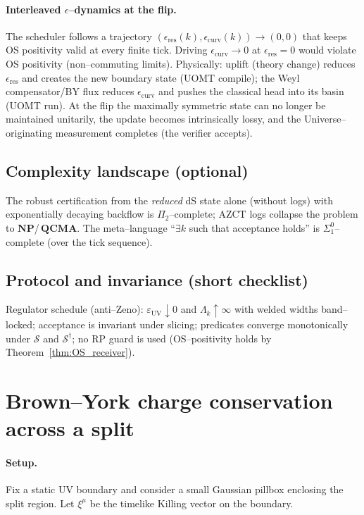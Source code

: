 \documentclass[10pt]{article}
\theoremstyle{definition}
\theoremstyle{plain}
\begin{document}
\paragraph{Interleaved $\epsilon$--dynamics at the flip.}\label{par:uom-main-205}
The scheduler follows a trajectory $(\epsilon_{\mathrm{res}}(k),\epsilon_{\mathrm{curv}}(k))\to(0,0)$ that keeps OS positivity valid at every finite tick.
Driving $\epsilon_{\mathrm{curv}}\to 0$ at $\epsilon_{\mathrm{res}}=0$ would violate OS positivity (non--commuting limits).
Physically: uplift (theory change) reduces $\epsilon_{\mathrm{res}}$ and creates the new boundary state (UOMT compile); the Weyl compensator/BY flux reduces $\epsilon_{\mathrm{curv}}$ and pushes the classical head into its basin (UOMT run).
At the flip the maximally symmetric state can no longer be maintained unitarily, the update becomes intrinsically lossy, and the Universe--originating measurement completes (the verifier accepts).

\subsection{Complexity landscape (optional)}
\label{subsec:complexity-8}
The robust certification from the \emph{reduced} dS state alone (without logs) with exponentially decaying backflow is $\Pi_2$--complete; AZCT logs collapse the problem to $\mathbf{NP}$/\,$\mathbf{QCMA}$.
The meta--language ``$\exists k$ such that acceptance holds'' is $\Sigma^0_1$--complete (over the tick sequence).

\subsection{Protocol and invariance (short checklist)}
\label{subsec:protocol-8}
Regulator schedule (anti--Zeno): $\varepsilon_{\mathrm{UV}}\downarrow 0$ and $\Lambda_k\uparrow \infty$ with welded widths band--locked; acceptance is invariant under slicing; predicates converge monotonically under $\mathcal S$ and $\mathcal S^\dagger$; no RP guard is used (OS--positivity holds by Theorem~\ref{thm:OS_receiver}).


\newpage
\appendix
\section{Brown--York charge conservation across a split}
\label{app:energy-split}

\paragraph{Setup.}\label{par:uom-main-206}
Fix a static UV boundary and consider a small Gaussian pillbox enclosing the split region.
Let $\xi^\mu$ be the timelike Killing vector on the boundary.
\end{document}

